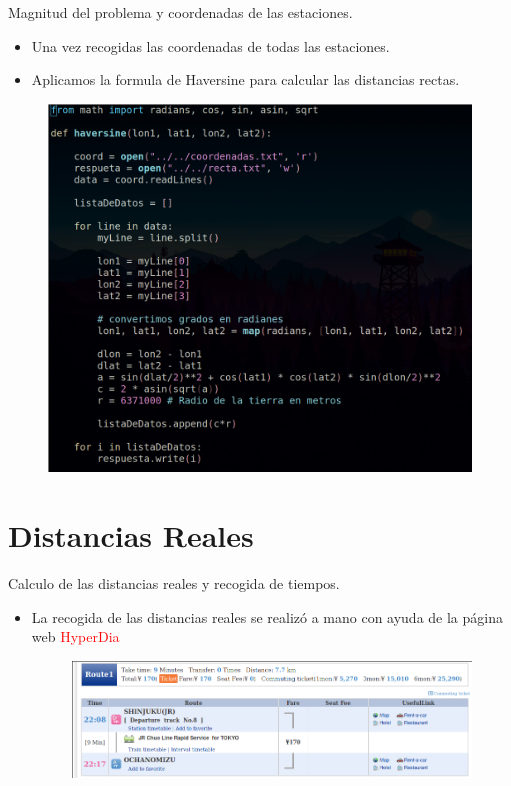 \documentclass{beamer}
\begin{document}
\begin{frame}{Magnitud del problema y coordenadas de las estaciones.}
  \begin{itemize}
    \item Una vez recogidas las coordenadas de todas las estaciones.
    \item Aplicamos la formula de Haversine para calcular las distancias rectas.
  \end{itemize}
  \begin{figure}[H]
    \centering
    \includegraphics[scale=0.20]{"../pics/haversine.png"}
  \end{figure}
\end{frame}

\section{Distancias Reales}
\begin{frame}{Calculo de las distancias reales y recogida de tiempos.}
  \begin{itemize}
    \item La recogida de las distancias reales se realizó a mano con ayuda de la página web \textcolor{red}{HyperDia}
    \vspace{0.5cm}
    \begin{figure}[H]
      \centering
      \includegraphics[scale=0.30]{"../pics/hyperDia.png"}
    \end{figure}
  \end{itemize}
\end{frame}
\end{document}
